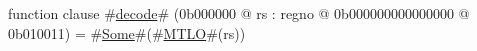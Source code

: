 function clause #\hyperref[zdecode]{decode}# (0b000000 @ rs : regno @ 0b000000000000000 @ 0b010011) =
  #\hyperref[zSome]{Some}#(#\hyperref[zMTLO]{MTLO}#(rs))
